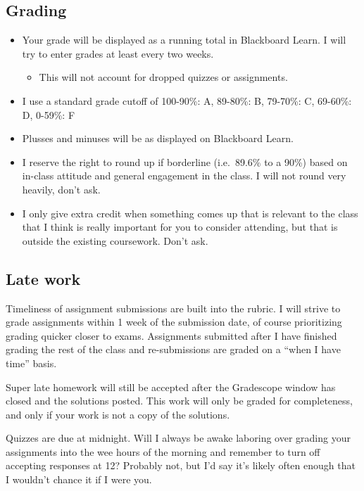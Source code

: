 \documentclass[
]{article}
\providecommand{\tightlist}{%
  \setlength{\itemsep}{0pt}\setlength{\parskip}{0pt}}
\begin{document}
\hypertarget{grading}{%
\subsection{Grading}\label{grading}}

\begin{itemize}
\tightlist
\item
  Your grade will be displayed as a running total in Blackboard Learn. I
  will try to enter grades at least every two weeks.

  \begin{itemize}
  \tightlist
  \item
    This will not account for dropped quizzes or assignments.
  \end{itemize}
\item
  I use a standard grade cutoff of 100-90\%: A, 89-80\%: B, 79-70\%: C,
  69-60\%: D, 0-59\%: F
\item
  Plusses and minuses will be as displayed on Blackboard Learn.
\item
  I reserve the right to round up if borderline (i.e.~89.6\% to a 90\%)
  based on in-class attitude and general engagement in the class. I will
  not round very heavily, don't ask.
\item
  I only give extra credit when something comes up that is relevant to
  the class that I think is really important for you to consider
  attending, but that is outside the existing coursework. Don't ask.
\end{itemize}

\hypertarget{late-work}{%
\subsection{Late work}\label{late-work}}

Timeliness of assignment submissions are built into the rubric. I will
strive to grade assignments within 1 week of the submission date, of
course prioritizing grading quicker closer to exams. Assignments
submitted after I have finished grading the rest of the class and
re-submissions are graded on a ``when I have time'' basis.

Super late homework will still be accepted after the Gradescope window
has closed and the solutions posted. This work will only be graded for
completeness, and only if your work is not a copy of the solutions.

Quizzes are due at midnight. Will I always be awake laboring over
grading your assignments into the wee hours of the morning and remember
to turn off accepting responses at 12? Probably not, but I'd say it's
likely often enough that I wouldn't chance it if I were you.
\end{document}
